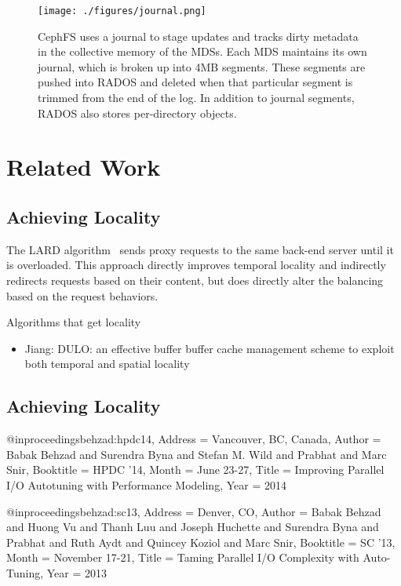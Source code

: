 \documentclass[conference]{acm_proc_article-sp} \usepackage[english]{babel}
\begin{document}
\begin{figure*}[tb] \centering
\texttt{[image: ./figures/journal.png]} \caption{CephFS uses
a journal to stage updates and tracks dirty metadata in the collective memory
of the MDSs. Each MDS maintains its own journal, which is broken up into 4MB
segments. These segments are pushed into RADOS and deleted when that particular
segment is trimmed from the end of the log. In addition to journal segments,
RADOS also stores per-directory objects. \label{figure:journal}} \end{figure*}

\section{Related Work} \label{related-work} 

\subsection{Achieving Locality} The LARD algorithm~\cite{pai:asplos1998-lard}
sends proxy requests to the same back-end server until it is overloaded. This
approach directly improves temporal locality and indirectly redirects requests
based on their content, but does directly alter the balancing based on the
request behaviors.

Algorithms that get locality \begin{itemize} \item Jiang: DULO: an effective
buffer buffer cache management scheme to exploit both temporal and spatial
locality \end{itemize}

\subsection{Achieving Locality}

@inproceedings{behzad:hpdc14, Address = {Vancouver, BC, Canada}, Author =
{Babak Behzad and Surendra Byna and Stefan M. Wild and Prabhat and Marc Snir},
Booktitle = {HPDC '14}, Month = {June 23-27}, Title = {Improving Parallel I/O
Autotuning with Performance Modeling}, Year = {2014}}

@inproceedings{behzad:sc13, Address = {Denver, CO}, Author = {Babak Behzad and
Huong Vu and Thanh Luu and Joseph Huchette and Surendra Byna and Prabhat and
Ruth Aydt and Quincey Koziol and Marc Snir}, Booktitle = {SC '13}, Month =
{November 17-21}, Title = {Taming Parallel I/O Complexity with Auto-Tuning},
Year = {2013}}
\end{document}
